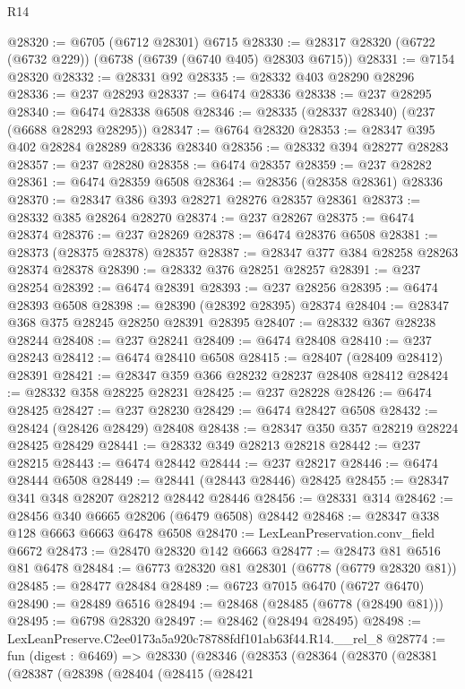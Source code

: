 \begin{lexlean}{R14}
\begin{coremodule}
@28320 := @6705 (@6712 @28301) @6715
@28330 := @28317 @28320 (@6722 (@6732 @229)) (@6738 (@6739 (@6740 @405) @28303 @6715))
@28331 := @7154 @28320
@28332 := @28331 @92
@28335 := @28332 @403 @28290 @28296
@28336 := @237 @28293
@28337 := @6474 @28336
@28338 := @237 @28295
@28340 := @6474 @28338 @6508
@28346 := @28335 (@28337 @28340) (@237 (@6688 @28293 @28295))
@28347 := @6764 @28320
@28353 := @28347 @395 @402 @28284 @28289 @28336 @28340
@28356 := @28332 @394 @28277 @28283
@28357 := @237 @28280
@28358 := @6474 @28357
@28359 := @237 @28282
@28361 := @6474 @28359 @6508
@28364 := @28356 (@28358 @28361) @28336
@28370 := @28347 @386 @393 @28271 @28276 @28357 @28361
@28373 := @28332 @385 @28264 @28270
@28374 := @237 @28267
@28375 := @6474 @28374
@28376 := @237 @28269
@28378 := @6474 @28376 @6508
@28381 := @28373 (@28375 @28378) @28357
@28387 := @28347 @377 @384 @28258 @28263 @28374 @28378
@28390 := @28332 @376 @28251 @28257
@28391 := @237 @28254
@28392 := @6474 @28391
@28393 := @237 @28256
@28395 := @6474 @28393 @6508
@28398 := @28390 (@28392 @28395) @28374
@28404 := @28347 @368 @375 @28245 @28250 @28391 @28395
@28407 := @28332 @367 @28238 @28244
@28408 := @237 @28241
@28409 := @6474 @28408
@28410 := @237 @28243
@28412 := @6474 @28410 @6508
@28415 := @28407 (@28409 @28412) @28391
@28421 := @28347 @359 @366 @28232 @28237 @28408 @28412
@28424 := @28332 @358 @28225 @28231
@28425 := @237 @28228
@28426 := @6474 @28425
@28427 := @237 @28230
@28429 := @6474 @28427 @6508
@28432 := @28424 (@28426 @28429) @28408
@28438 := @28347 @350 @357 @28219 @28224 @28425 @28429
@28441 := @28332 @349 @28213 @28218
@28442 := @237 @28215
@28443 := @6474 @28442
@28444 := @237 @28217
@28446 := @6474 @28444 @6508
@28449 := @28441 (@28443 @28446) @28425
@28455 := @28347 @341 @348 @28207 @28212 @28442 @28446
@28456 := @28331 @314
@28462 := @28456 @340 @6665 @28206 (@6479 @6508) @28442
@28468 := @28347 @338 @128 @6663 @6663 @6478 @6508
@28470 := LexLeanPreservation.conv_field @6672
@28473 := @28470 @28320 @142 @6663
@28477 := @28473 @81 @6516 @81 @6478
@28484 := @6773 @28320 @81 @28301 (@6778 (@6779 @28320 @81))
@28485 := @28477 @28484
@28489 := @6723 @7015 @6470 (@6727 @6470)
@28490 := @28489 @6516
@28494 := @28468 (@28485 (@6778 (@28490 @81)))
@28495 := @6798 @28320
@28497 := @28462 (@28494 @28495)
@28498 := LexLeanPreserve.C2ee0173a5a920c78788fdf101ab63f44.R14.__rel_8
@28774 := fun (digest : @6469) =>
  @28330
    (@28346
      (@28353
        (@28364
          (@28370
            (@28381
              (@28387
                (@28398
                  (@28404
                    (@28415
                      (@28421

\end{coremodule}
\end{lexlean}
